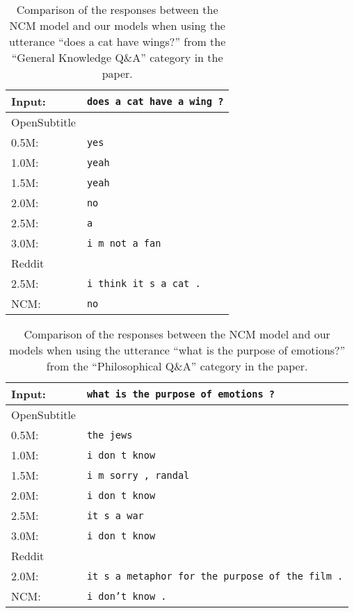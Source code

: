 \begin{table}[H]
	\centering
	\begin{adjustbox}{max width=\textwidth}
		\begin{tabular}{ll}
			\toprule
			Input: 	& \texttt{does a cat have a wing ?}\\
			\midrule
			OpenSubtitle\\
			0.5M: 	& \texttt{yes}\\
			1.0M: 	& \texttt{yeah}\\
			1.5M:	& \texttt{yeah}\\
			2.0M:	& \texttt{no}\\
			2.5M:	& \texttt{a}\\
			3.0M:	& \texttt{i m not a fan}\\
			\midrule
			Reddit\\
			2.5M:	& \texttt{i think it s a cat .}\\
			\midrule
			NCM:	& \texttt{no}\\
			\bottomrule
		\end{tabular}
	\end{adjustbox}
	\caption{Comparison of the responses between the NCM model and our models when using the utterance ``does a cat have wings?'' from the ``General Knowledge Q\&A'' category in the paper.}
	\label{results:example17_output:Neural_Conversational_Model_compared}
\end{table}


\begin{table}[H]
	\centering
	\begin{adjustbox}{max width=\textwidth}
		\begin{tabular}{ll}
			\toprule
			Input: 	& \texttt{what is the purpose of emotions ?}\\
			\midrule
			OpenSubtitle\\
			0.5M: 	& \texttt{the jews}\\
			1.0M: 	& \texttt{i don t know}\\
			1.5M:	& \texttt{i m sorry , randal}\\
			2.0M:	& \texttt{i don t know}\\
			2.5M:	& \texttt{it s a war}\\
			3.0M:	& \texttt{i don t know}\\
			\midrule
			Reddit\\
			2.0M:	& \texttt{it s a metaphor for the purpose of the film .}\\
			\midrule
			NCM:	& \texttt{i don't know .}\\
			\bottomrule
		\end{tabular}
	\end{adjustbox}
	\caption{Comparison of the responses between the NCM model and our models when using the utterance ``what is the purpose of emotions?'' from the ``Philosophical Q\&A'' category in the paper.}
	\label{results:example17_output:Neural_Conversational_Model_compared}
\end{table}

